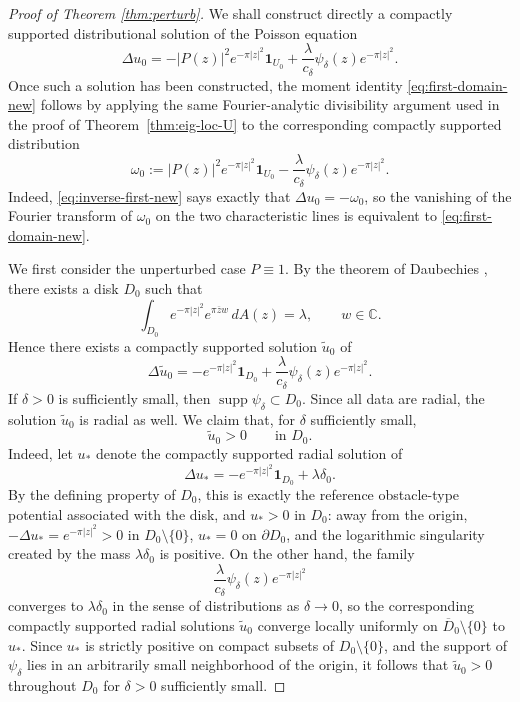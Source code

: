 \documentclass[a4paper,11pt,reqno]{amsart}
\numberwithin{equation}{section}
\theoremstyle{plain} %
\theoremstyle{definition} %
\theoremstyle{remark}
\DeclareMathOperator{\supp}{supp}
\newcommand{\C}{\mathbb{C}}
\begin{document}
\begin{proof}[Proof of Theorem \ref{thm:perturb}]
We shall construct directly a compactly supported distributional solution of the
Poisson equation
\begin{equation}\label{eq:inverse-first-new}
\Delta u_0
=
-|P(z)|^2 e^{-\pi|z|^2}\mathbf{1}_{U_0}
+\frac{\lambda}{c_\delta}\psi_\delta(z)e^{-\pi|z|^2}.
\end{equation}
Once such a solution has been constructed, the moment identity
\eqref{eq:first-domain-new} follows by applying the same Fourier-analytic
divisibility argument used in the proof of Theorem~\ref{thm:eig-loc-U} to the
corresponding compactly supported distribution
\[
\omega_0:=
|P(z)|^2e^{-\pi|z|^2}\mathbf 1_{U_0}
-\frac{\lambda}{c_\delta}\psi_\delta(z)e^{-\pi|z|^2}.
\]
Indeed, \eqref{eq:inverse-first-new} says exactly that \(\Delta u_0=-\omega_0\),
so the vanishing of the Fourier transform of \(\omega_0\) on the two
characteristic lines is equivalent to \eqref{eq:first-domain-new}.

We first consider the unperturbed case $P\equiv 1$. By the theorem of Daubechies \cite{Daubechies}, there exists a disk $D_0$ such that
\[
\int_{D_0} e^{-\pi|z|^2}e^{\pi \overline z w}\,dA(z)=\lambda,
\qquad w\in\C.
\]
Hence there exists a compactly supported solution $\widetilde u_0$ of
\begin{equation}\label{eq:unperturbed-free-boundary-new}
\Delta \widetilde u_0
=
- e^{-\pi|z|^2}\mathbf{1}_{D_0}
+\frac{\lambda}{c_\delta}\psi_\delta(z)e^{-\pi|z|^2}.
\end{equation}
If $\delta>0$ is sufficiently small, then $\supp\psi_\delta\subset D_0$. Since all
data are radial, the solution $\widetilde u_0$ is radial as well. We claim that,
for $\delta$ sufficiently small,
\[
\widetilde u_0>0 \qquad \text{in } D_0.
\]
Indeed, let \(u_*\) denote the compactly supported radial solution of
\[
\Delta u_*=-e^{-\pi|z|^2}\mathbf{1}_{D_0}+\lambda \delta_0.
\]
By the defining property of \(D_0\), this is exactly the reference obstacle-type
potential associated with the disk, and \(u_*>0\) in \(D_0\): away from the origin,
\(-\Delta u_*=e^{-\pi|z|^2}>0\) in \(D_0\setminus\{0\}\), \(u_*=0\) on \(\partial
D_0\), and the logarithmic singularity created by the mass \(\lambda\delta_0\) is
positive. On the other hand, the family
\[
\frac{\lambda}{c_\delta}\psi_\delta(z)e^{-\pi|z|^2}
\]
converges to \(\lambda \delta_0\) in the sense of distributions as \(\delta\to 0\),
so the corresponding compactly supported radial solutions \(\widetilde u_0\)
converge locally uniformly on \(\overline D_0\setminus\{0\}\) to \(u_*\). Since
\(u_*\) is strictly positive on compact subsets of \(D_0\setminus\{0\}\), and the
support of \(\psi_\delta\) lies in an arbitrarily small neighborhood of the
origin, it follows that \(\widetilde u_0>0\) throughout \(D_0\) for \(\delta>0\)
sufficiently small.


\end{proof}
\end{document}
